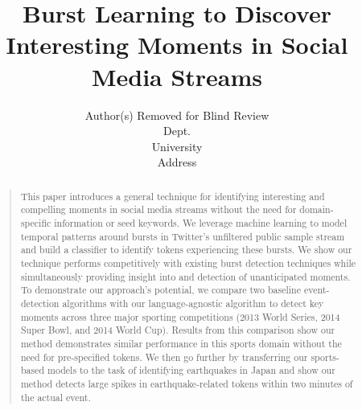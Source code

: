 \documentclass[letterpaper]{article}
\begin{document}
%
\title{Burst Learning to Discover Interesting Moments in Social Media Streams}
\author{Author(s) Removed for Blind Review\\
Dept. \\
University \\
Address \\
}
\maketitle
\begin{abstract}
\begin{quote}
This paper introduces a general technique for identifying interesting and compelling moments in social media streams without the need for domain-specific information or seed keywords.
We leverage machine learning to model temporal patterns around bursts in Twitter's unfiltered public sample stream and build a classifier to identify tokens experiencing these bursts.
We show our technique performs competitively with existing burst detection techniques while simultaneously providing insight into and detection of unanticipated moments.
To demonstrate our approach's potential, we compare two baseline event-detection algorithms with our language-agnostic algorithm to detect key moments across three major sporting competitions (2013 World Series, 2014 Super Bowl, and 2014 World Cup).
Results from this comparison show our method demonstrates similar performance in this sports domain without the need for pre-specified tokens.
We then go further by transferring our sports-based models to the task of identifying earthquakes in Japan and show our method detects large spikes in earthquake-related tokens within two minutes of the actual event.
\end{quote}
\end{abstract}

%
\end{document}
